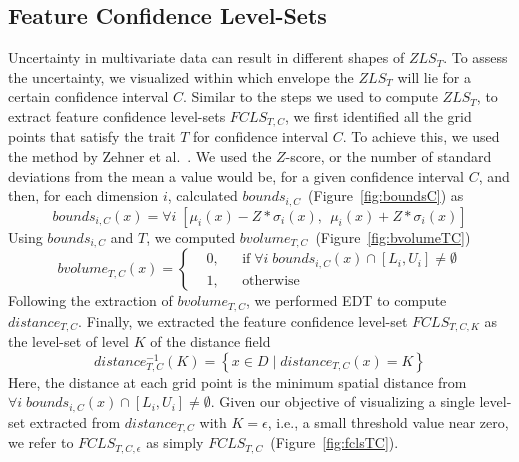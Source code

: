 \vspace{-2mm}
\subsection{Feature Confidence Level-Sets}
\label{sec:fcls}
%
Uncertainty in multivariate data can result in different shapes of $ZLS_{T}$.
%
To assess the uncertainty, we visualized within which envelope the $ZLS_{T}$ will lie for a certain confidence interval $C$.
%
Similar to the steps we used to compute $ZLS_{T}$, to extract feature confidence level-sets $FCLS_{T,C}$, we first identified all the grid points that satisfy the trait $T$ for confidence interval $C$.
%
To achieve this, we used the method by Zehner et al.~\cite{zehner2010visualization}. 
%
We used the $Z$-score, or the number of standard deviations from the mean a value would be, for a given confidence interval $C$, and then, for each dimension $i$, calculated $bounds_{i,C}$~(Figure~\ref{fig:boundsC}) as
\begin{equation}
bounds_{i,C}(x) = \forall i \; [{\mu}_{i}(x) - Z*{\sigma}_{i}(x),~~{\mu}_{i}(x) + Z*{\sigma}_{i}(x)]
\end{equation}
%
Using $bounds_{i,C}$ and $T$, we computed $bvolume_{T,C}$~(Figure~\ref{fig:bvolumeTC})
\begin{equation}
  bvolume_{T,C}(x) = \left \{
  \begin{aligned}
    &0, && \text{if}\; \forall i\; bounds_{i, C}(x) \cap [L_{i}, U_{i}] \neq \emptyset \\
    &1, && \text{otherwise}
  \end{aligned} \right.
\end{equation}
%
Following the extraction of $bvolume_{T,C}$, we performed EDT to compute $distance_{T,C}$.
%
Finally, we extracted the feature confidence level-set $FCLS_{T,C,K}$ as the level-set of level $K$ of the distance field
%
\begin{equation} 
distance_{T,C}^{-1}(K) = \left\{ x \in D\; |\; distance_{T,C}(x) = K\right\}
\end{equation}
Here, the distance at each grid point is the minimum spatial distance from $\forall i\; bounds_{i,C}(x) \cap [L_{i}, U_{i}] \neq \emptyset$.
%
Given our objective of visualizing a single level-set extracted from $distance_{T,C}$ with $K = \epsilon$, i.e., a small threshold value near zero, we refer to $FCLS_{T,C,\epsilon}$ as simply $FCLS_{T,C}$~(Figure~\ref{fig:fclsTC}).
%
